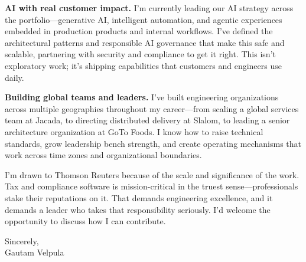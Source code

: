 \documentclass[11pt]{article}
\begin{document}
\textbf{AI with real customer impact.} I'm currently leading our AI strategy across the portfolio---generative AI, intelligent automation, and agentic experiences embedded in production products and internal workflows. I've defined the architectural patterns and responsible AI governance that make this safe and scalable, partnering with security and compliance to get it right. This isn't exploratory work; it's shipping capabilities that customers and engineers use daily.

\textbf{Building global teams and leaders.} I've built engineering organizations across multiple geographies throughout my career---from scaling a global services team at Jacada, to directing distributed delivery at Slalom, to leading a senior architecture organization at GoTo Foods. I know how to raise technical standards, grow leadership bench strength, and create operating mechanisms that work across time zones and organizational boundaries.

I'm drawn to Thomson Reuters because of the scale and significance of the work. Tax and compliance software is mission-critical in the truest sense---professionals stake their reputations on it. That demands engineering excellence, and it demands a leader who takes that responsibility seriously. I'd welcome the opportunity to discuss how I can contribute.

\vspace{16pt}

Sincerely, \\
Gautam Velpula
\end{document}
